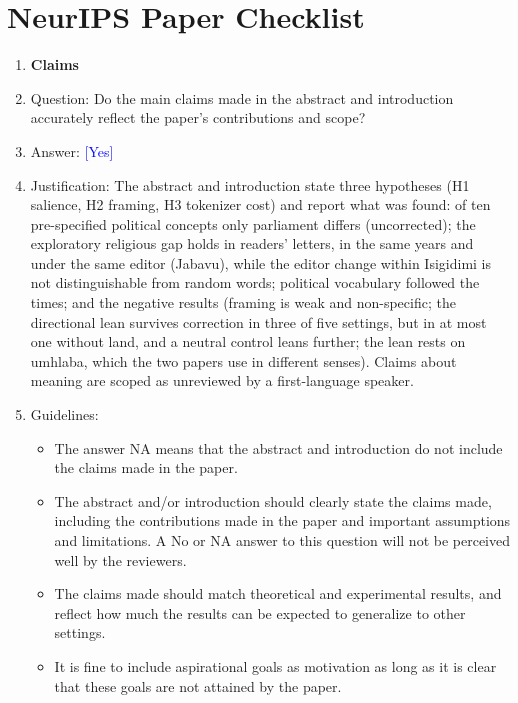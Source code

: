 \documentclass[10pt,letterpaper]{article}
\newcommand{\answerYes}[1][]{\textcolor{blue}{[Yes] #1}}
\begin{document}
\section*{NeurIPS Paper Checklist}
\begin{enumerate}

\item {\bf Claims}
    \item[] Question: Do the main claims made in the abstract and introduction accurately reflect the paper's contributions and scope?
    \item[] Answer: \answerYes{}
    \item[] Justification: The abstract and introduction state three hypotheses (H1 salience, H2 framing, H3 tokenizer cost) and report what was found: of ten pre-specified political concepts only parliament differs (uncorrected); the exploratory religious gap holds in readers' letters, in the same years and under the same editor (Jabavu), while the editor change within Isigidimi is not distinguishable from random words; political vocabulary followed the times; and the negative results (framing is weak and non-specific; the directional lean survives correction in three of five settings, but in at most one without land, and a neutral control leans further; the lean rests on umhlaba, which the two papers use in different senses). Claims about meaning are scoped as unreviewed by a first-language speaker.
    \item[] Guidelines:
    \begin{itemize}
        \item The answer NA means that the abstract and introduction do not include the claims made in the paper.
        \item The abstract and/or introduction should clearly state the claims made, including the contributions made in the paper and important assumptions and limitations. A No or NA answer to this question will not be perceived well by the reviewers. 
        \item The claims made should match theoretical and experimental results, and reflect how much the results can be expected to generalize to other settings. 
        \item It is fine to include aspirational goals as motivation as long as it is clear that these goals are not attained by the paper. 
    \end{itemize}


\end{enumerate}
\end{document}
